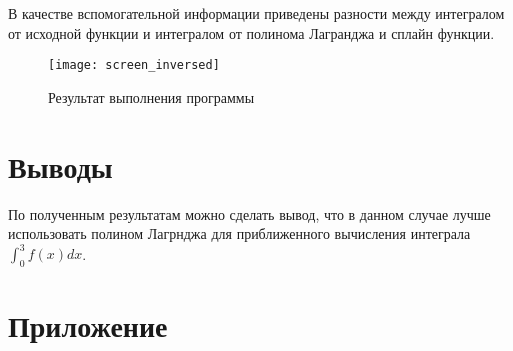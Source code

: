 В качестве вспомогательной информации приведены разности между интегралом от исходной функции и интегралом от полинома Лагранджа и сплайн функции.

\begin{figure}[H]
\begin{center}
	\texttt{[image: screen\_inversed]}
	\caption{Результат выполнения программы}
	\label{fig:res}
\end{center}
\end{figure}

\section{Выводы}

По полученным результатам можно сделать вывод, что в данном случае лучше использовать полином Лагрнджа для приближенного вычисления интеграла $\int_0^3 f(x)dx$.

\section*{Приложение}


\parindent=1cm


